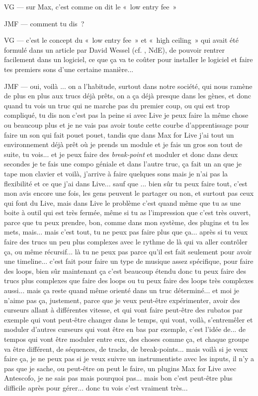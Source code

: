VG — sur Max, c'est comme on dit le « low entry fee »  

JMF — comment tu dis ? 

VG — c'est le concept du « low entry fee » et « high ceiling » qui avait été formulé dans un article par David Wessel (cf. \cite{wessel_problems_2001}, NdE), de pouvoir rentrer facilement dans un logiciel, ce que ça va te coûter pour installer le logiciel et faire tes premiers sons d'une certaine manière... 

JMF — oui, voilà ... on a l'habitude, surtout dans notre société, qui nous ramène de plus en plus aux trucs déjà prêts, on a ça déjà presque dans les gènes, et donc quand tu vois un truc qui ne marche pas du premier coup, ou qui est trop compliqué, tu dis non c'est pas la peine si avec Live je peux faire la même chose ou beaucoup plus et je ne vais pas avoir toute cette courbe d'apprentissage pour faire un son qui fait pouet pouet, tandis que dans Max for Live j'ai tout un environnement déjà prêt où je prends un module et je fais un gros son tout de suite, tu vois... et je peux faire des \textit{break-point} et moduler et donc dans deux secondes je te fais une compo géniale et dans l'autre truc, ça fait un an que je tape mon clavier et voilà, j'arrive à faire quelques sons mais je n'ai pas la flexibilité et ce que j'ai dans Live... sauf que ... bien sûr tu peux faire tout, c'est mon avis encore une fois, les gens peuvent le partager ou non, et surtout pas ceux qui font du Live, mais dans Live le problème c'est quand même que tu as une boite à outil qui est très fermée, même si tu as l'impression que c'est très ouvert, parce que tu peux prendre, bon, comme dans mon système, des plugins et tu les mets, mais... mais c'est tout, tu ne peux pas faire plus que ça... après si tu veux faire des trucs un peu plus complexes avec le rythme de là qui va aller contrôler ça, ou même récursif... là tu ne peux pas parce qu'il est fait seulement pour avoir une timeline... c'est fait pour faire un type de musique assez spécifique, pour faire des loops, bien sûr maintenant ça c'est beaucoup étendu donc tu peux faire des trucs plus complexes que faire des loops ou tu peux faire des loops très complexes aussi... mais ça reste quand même orienté dans un truc déterminé... et moi je n'aime pas ça, justement, parce que je veux peut-être expérimenter, avoir des curseurs allant à différentes vitesse, et qui vont faire peut-être des rubatos par exemple qui vont peut-être changer dans le temps, qui vont, voilà, s'entremêler et moduler d'autres curseurs qui vont être en bas par exemple, c'est l'idée de... de tempos qui vont être moduler entre eux, des choses comme ça, et chaque groupe va être différent, de séquences, de tracks, de break-points... mais voilà si je veux faire ça, je ne peux pas si je veux suivre un instrumentiste avec les inputs, il n'y a pas que je sache, ou peut-être on peut le faire, un plugins Max for Live avec Antescofo, je ne sais pas mais pourquoi pas... mais bon c'est peut-être plus difficile après pour gérer... donc tu vois c'est vraiment très... 

